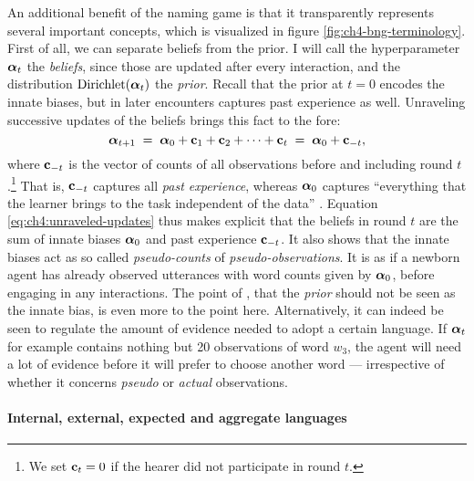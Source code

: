 \documentclass{../src/bcthesispart}
\begin{document}
An additional benefit of the \DC{} naming game is that it transparently represents several important concepts, which is visualized in figure \ref{fig:ch4-bng-terminology}.
First of all, we can separate beliefs from the prior. 
I will call the hyperparameter $\boldsymbol{\mathbf{\alpha}}_t$ the \emph{beliefs}, since those are updated after every interaction, and the distribution $\text{Dirichlet}(\boldsymbol{\mathbf{\alpha}}_t)$ the \emph{prior}.
Recall that the prior at $t=0$ encodes the innate biases, but in later encounters captures past experience as well.
Unraveling successive updates of the beliefs brings this fact to the fore:
\begin{equation}
	\label{eq:ch4:unraveled-updates}
	\boldsymbol{\mathbf{\alpha}}_{t+1} 
		\;=\; \boldsymbol{\mathbf{\alpha}}_0 + \boldsymbol{\mathbf{c}}_1 + \boldsymbol{\mathbf{c}}_2 + \dots + \boldsymbol{\mathbf{c}}_t 
		\;=\; \boldsymbol{\mathbf{\alpha}}_0 + \boldsymbol{\mathbf{c}}_{-t},
\end{equation}
where $\boldsymbol{\mathbf{c}}_{-t}$ is the vector of counts of all observations before and including round $t$.\footnote{%
		We set $\boldsymbol{\mathbf{c}}_t = 0$ if the hearer did not participate in round $t$.
	}
That is, $\boldsymbol{\mathbf{c}}_{-t}$ captures all \emph{past experience}, whereas $\boldsymbol{\mathbf{\alpha}} _0$ captures “everything that the learner brings to the task independent of the data” \parencite{Kirby2004}.
Equation \ref{eq:ch4:unraveled-updates} thus makes explicit that the beliefs in round $t$ are the sum of innate biases $\boldsymbol{\mathbf{\alpha}}_0$ and past experience $\boldsymbol{\mathbf{c}}_{-t}$.
It also shows that the innate biases act as so called \emph{pseudo-counts} of \emph{pseudo-observations}.
It is as if a newborn agent has already observed utterances with word counts given by $\boldsymbol{\mathbf{\alpha}}_0$, before engaging in any interactions.
The point of \textcite{Griffiths2007a}, that the \emph{prior} should not be seen as the innate bias, is even more to the point here.
Alternatively, it can indeed be seen to regulate the amount of evidence needed to adopt a certain language.
If $\boldsymbol{\mathbf{\alpha}}_t$ for example contains nothing but 20 observations of word $w_3$, the agent will need a lot of evidence before it will prefer to choose another word — irrespective of whether it concerns \emph{pseudo} or \emph{actual} observations.




\paragraph{Internal, external, expected and aggregate languages}
\end{document}
